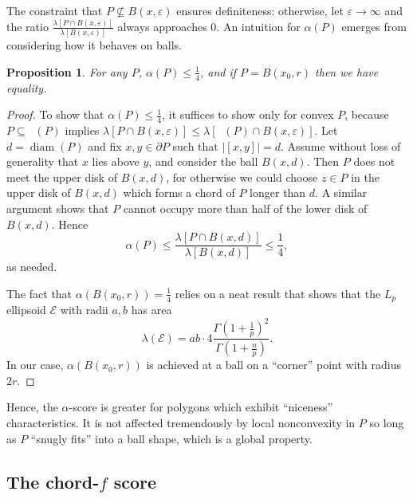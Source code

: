 \documentclass[]{jocg}
\newcommand{\EE}{\mathcal{E}}
\newcommand{\abs}[1]{|#1|}
\DeclareMathOperator{\diam}{\mathrm{diam}}
\DeclareMathOperator{\conv}{\mathcal{}}
\newtheorem{proposition}{Proposition}[section]
\theoremstyle{definition}
\theoremstyle{remark}
\begin{document}
The constraint that $P \not\subseteq B(x,\varepsilon)$ ensures definiteness:
otherwise, let $\varepsilon \to \infty$ and the ratio $\frac{\lambda[P \cap B(x,
\varepsilon)]}{\lambda[B(x, \varepsilon)]}$ always approaches $0$. An intuition
for $\alpha(P)$ emerges from considering how it behaves on balls.

\begin{proposition}
  For any $P$, $\alpha(P) \leq \frac{1}{4}$, and if $P = B(x_0, r)$
  then we have equality.
  \label{prop:alpha}
\end{proposition}

\begin{proof}
  To show that $\alpha(P) \leq \frac{1}{4}$, it suffices to show only for convex
  $P$, because $P \subseteq \conv(P)$ implies $\lambda[P \cap B(x, \varepsilon)]
  \leq \lambda[\conv(P) \cap B(x, \varepsilon)]$. Let $d = \diam (P)$ and fix
  $x,y \in \partial P$ such that $\abs{[x,y]} = d$. Assume without loss of
  generality that $x$ lies above $y$, and consider the ball $B(x, d)$. Then $P$
  does not meet the upper disk of $B(x,d)$, for otherwise we could choose $z \in
  P$ in the upper disk of $B(x,d)$ which forms a chord of $P$ longer than $d$.
  A similar argument shows that $P$ cannot occupy more than half of the lower
  disk of $B(x,d)$. Hence
  \begin{equation*}
    \alpha(P) \leq \frac{\lambda[P \cap B(x,d)]}{\lambda[B(x,d)]} \leq
    \frac{1}{4},
  \end{equation*}
  as needed.

  The fact that $\alpha(B(x_0, r)) = \frac{1}{4}$ relies on a neat
  result \cite{10.2307/30044198} that shows that the $L_p$
  ellipsoid $\EE$ with radii $a, b$ has area
  \begin{equation*}
    \lambda(\EE) = a b \cdot 4
    \frac{\Gamma(1+\frac{1}{p})^2}{\Gamma(1+\frac{n}{p})}.
  \end{equation*}
  In our case, $\alpha(B(x_0, r))$ is achieved at a ball on a ``corner'' point
  with radius $2r$.
\end{proof}

Hence, the $\alpha$-score is greater for polygons which exhibit ``niceness''
characteristics. It is not affected tremendously by local nonconvexity in $P$ so
long as $P$ ``snugly fits'' into a ball shape, which is a global property.

\subsection{The chord-$f$ score}
\end{document}
